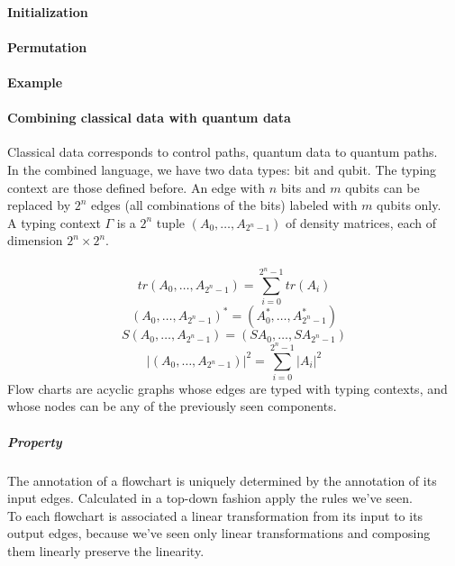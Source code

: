 \documentclass[10pt]{report}
\begin{document}
\paragraph{Initialization} %
\paragraph{Permutation} %
\paragraph{Example}
\paragraph{Combining classical data with quantum data} Classical data corresponds to control paths, quantum data to quantum paths.\\
In the combined language, we have two data types: bit and qubit. The typing context are those defined before. An edge with $n$ bits and $m$ qubits can be replaced by $2^n$ edges (all combinations of the bits) labeled with $m$ qubits only.\\
A typing context $\Gamma$ is a $2^n$ tuple $(A_0,\ldots, A_{2^n-1})$ of density matrices, each of dimension $2^n\times 2^n$.\\\\
$$tr(A_0,\ldots,A_{2^n-1}) = \sum_{i=0}^{2^n-1} tr(A_i)$$
$$(A_0,\ldots,A_{2^n-1})^* = (A_0^*,\ldots,A_{2^n-1}^*)$$
$$S(A_0,\ldots,A_{2^n-1}) = (SA_0,\ldots,SA_{2^n-1})$$
$$|(A_0,\ldots,A_{2^n-1})|^2 = \sum_{i=0}^{2^n-1} |A_i|^2$$
Flow charts are acyclic graphs whose edges are typed with typing contexts, and whose nodes can be any of the previously seen components.
\subparagraph{Property} The annotation of a flowchart is uniquely determined by the annotation of its input edges. Calculated in a top-down fashion apply the rules we've seen.\\
To each flowchart is associated a linear transformation from its input to its output edges, because we've seen only linear transformations and composing them linearly preserve the linearity.
\end{document}
